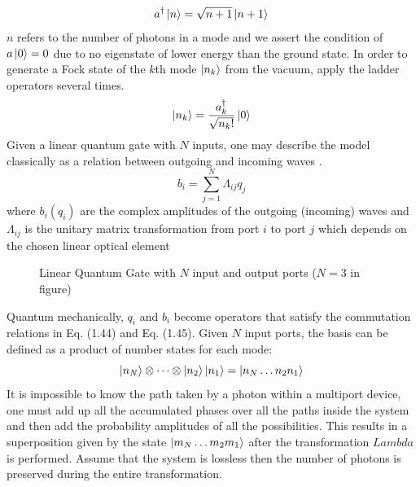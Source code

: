 \begin{equation}
    a^{\dagger} \ket{n} = \sqrt{n+1} \ket{n+1}
\end{equation}
$n$ refers to the number of photons in a mode and we assert the condition of $a\ket{0} = 0$ due to no eigenstate of lower energy than the ground state. In order to generate a Fock state of the $k$th mode $\ket{n_k}$ from the vacuum, apply the ladder operators several times.
\begin{equation}
    \ket{n_k} = \frac{a_{k}^{\dagger}}{\sqrt{n_{k}!}}\ket{0}
\end{equation}
Given a linear quantum gate with $N$ inputs, one may describe the model classically as a relation between outgoing and incoming waves \cite{10.1007/3-540-49208-9_36}.
\begin{equation}
    b_{i} = \sum_{j=1}^{N} \Lambda_{ij}q_{j}
\end{equation}
where $b_{i}(q_{i})$ are the complex amplitudes of the outgoing (incoming) waves and $\Lambda_{ij}$ is the unitary matrix transformation from port $i$ to port $j$ which depends on the chosen linear optical element
\begin{figure}[H]
    \centering
{}
    \caption{Linear Quantum Gate with $N$ input and output ports ($N=3$ in figure)}
    \label{fig:my_label}
\end{figure}
Quantum mechanically, $q_{i}$ and $b_{i}$ become operators that satisfy the commutation relations in Eq. (1.44) and Eq. (1.45). Given $N$ input ports, the basis can be defined as a product of number states for each mode: 
\begin{equation}
    \ket{n_{N}}\otimes \dots \otimes \ket{n_2} \ket{n_1} = \ket{n_{N}\dots n_{2}n_{1}}
\end{equation}
It is impossible to know the path taken by a photon within a multiport device, one must add up all the accumulated phases over all the paths inside the system and then add the probability amplitudes of all the possibilities. This results in a superposition given by the state $\ket{m_{N} \dots m_{2} m_{1}}$ after the transformation $Lambda$ is performed. Assume that the system is lossless then the number of photons is preserved during the entire transformation. \newline
